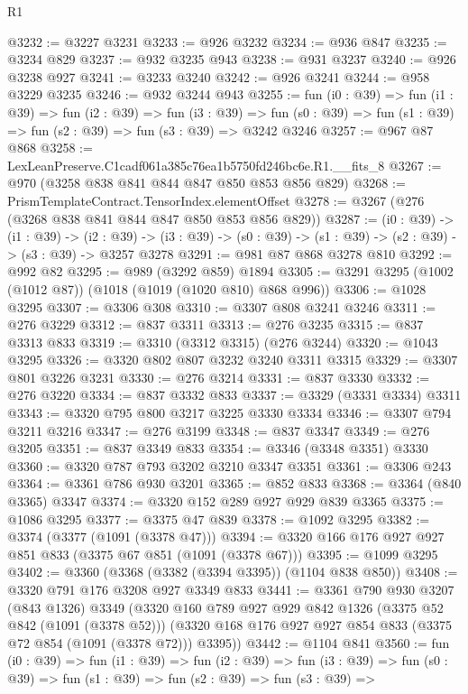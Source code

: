 \begin{lexlean}{R1}
\begin{coremodule}
@3232 := @3227 @3231
@3233 := @926 @3232
@3234 := @936 @847
@3235 := @3234 @829
@3237 := @932 @3235 @943
@3238 := @931 @3237
@3240 := @926 @3238 @927
@3241 := @3233 @3240
@3242 := @926 @3241
@3244 := @958 @3229 @3235
@3246 := @932 @3244 @943
@3255 := fun (i0 : @39) =>
  fun (i1 : @39) =>
  fun (i2 : @39) =>
  fun (i3 : @39) =>
  fun (s0 : @39) => fun (s1 : @39) => fun (s2 : @39) => fun (s3 : @39) => @3242 @3246
@3257 := @967 @87 @868
@3258 := LexLeanPreserve.C1cadf061a385c76ea1b5750fd246bc6e.R1.__fits_8
@3267 := @970 (@3258 @838 @841 @844 @847 @850 @853 @856 @829)
@3268 := PrismTemplateContract.TensorIndex.elementOffset
@3278 := @3267 (@276 (@3268 @838 @841 @844 @847 @850 @853 @856 @829))
@3287 := (i0 : @39) ->
  (i1 : @39) ->
  (i2 : @39) -> (i3 : @39) -> (s0 : @39) -> (s1 : @39) -> (s2 : @39) -> (s3 : @39) -> @3257 @3278
@3291 := @981 @87 @868 @3278 @810
@3292 := @992 @82
@3295 := @989 (@3292 @859) @1894
@3305 := @3291 @3295 (@1002 (@1012 @87)) (@1018 (@1019 (@1020 @810) @868 @996))
@3306 := @1028 @3295
@3307 := @3306 @308
@3310 := @3307 @808 @3241 @3246
@3311 := @276 @3229
@3312 := @837 @3311
@3313 := @276 @3235
@3315 := @837 @3313 @833
@3319 := @3310 (@3312 @3315) (@276 @3244)
@3320 := @1043 @3295
@3326 := @3320 @802 @807 @3232 @3240 @3311 @3315
@3329 := @3307 @801 @3226 @3231
@3330 := @276 @3214
@3331 := @837 @3330
@3332 := @276 @3220
@3334 := @837 @3332 @833
@3337 := @3329 (@3331 @3334) @3311
@3343 := @3320 @795 @800 @3217 @3225 @3330 @3334
@3346 := @3307 @794 @3211 @3216
@3347 := @276 @3199
@3348 := @837 @3347
@3349 := @276 @3205
@3351 := @837 @3349 @833
@3354 := @3346 (@3348 @3351) @3330
@3360 := @3320 @787 @793 @3202 @3210 @3347 @3351
@3361 := @3306 @243
@3364 := @3361 @786 @930 @3201
@3365 := @852 @833
@3368 := @3364 (@840 @3365) @3347
@3374 := @3320 @152 @289 @927 @929 @839 @3365
@3375 := @1086 @3295
@3377 := @3375 @47 @839
@3378 := @1092 @3295
@3382 := @3374 (@3377 (@1091 (@3378 @47)))
@3394 := @3320 @166 @176 @927 @927 @851 @833 (@3375 @67 @851 (@1091 (@3378 @67)))
@3395 := @1099 @3295
@3402 := @3360 (@3368 (@3382 (@3394 @3395)) (@1104 @838 @850))
@3408 := @3320 @791 @176 @3208 @927 @3349 @833
@3441 := @3361
    @790
    @930
    @3207
    (@843 @1326)
    @3349
    (@3320
      @160
      @789
      @927
      @929
      @842
      @1326
      (@3375 @52 @842 (@1091 (@3378 @52)))
      (@3320 @168 @176 @927 @927 @854 @833 (@3375 @72 @854 (@1091 (@3378 @72))) @3395))
@3442 := @1104 @841
@3560 := fun (i0 : @39) =>
  fun (i1 : @39) =>
  fun (i2 : @39) =>
  fun (i3 : @39) =>
  fun (s0 : @39) =>
  fun (s1 : @39) =>
  fun (s2 : @39) =>
  fun (s3 : @39) =>

\end{coremodule}
\end{lexlean}

